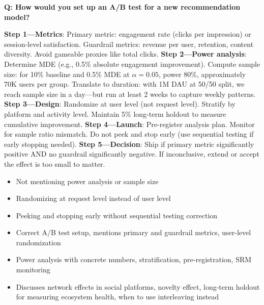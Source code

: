 \begin{interviewq}
\textbf{Q: How would you set up an A/B test for a new recommendation model?}

 \quad {} \quad \badgefreq{\freqhigh}

\stronganswer \textbf{Step 1---Metrics}: Primary metric: engagement rate (clicks per impression) or session-level satisfaction. Guardrail metrics: revenue per user, retention, content diversity. Avoid gameable proxies like total clicks. \textbf{Step 2---Power analysis}: Determine MDE (e.g., 0.5\% absolute engagement improvement). Compute sample size: for 10\% baseline and 0.5\% MDE at $\alpha = 0.05$, power 80\%, approximately 70K users per group. Translate to duration: with 1M DAU at 50/50 split, we reach sample size in a day---but run at least 2 weeks to capture weekly patterns. \textbf{Step 3---Design}: Randomize at user level (not request level). Stratify by platform and activity level. Maintain 5\% long-term holdout to measure cumulative improvement. \textbf{Step 4---Launch}: Pre-register analysis plan. Monitor for sample ratio mismatch. Do not peek and stop early (use sequential testing if early stopping needed). \textbf{Step 5---Decision}: Ship if primary metric significantly positive AND no guardrail significantly negative. If inconclusive, extend or accept the effect is too small to matter.

\redflags
\begin{itemize}
    \item Not mentioning power analysis or sample size
    \item Randomizing at request level instead of user level
    \item Peeking and stopping early without sequential testing correction
\end{itemize}


\goodgreat
\begin{itemize}
    \item {} Correct A/B test setup, mentions primary and guardrail metrics, user-level randomization
    \item {} Power analysis with concrete numbers, stratification, pre-registration, SRM monitoring
    \item {} Discusses network effects in social platforms, novelty effect, long-term holdout for measuring ecosystem health, when to use interleaving instead
\end{itemize}

\end{interviewq}

